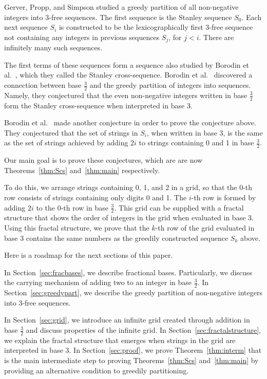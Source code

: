 \documentclass[12pt,reqno]{article}
\theoremstyle{plain}
\theoremstyle{definition}
\theoremstyle{remark}
\begin{document}
Gerver, Propp, and Simpson \cite{GPS} studied a greedy partition of all non-negative integers into 3-free sequences. The first sequence is the Stanley sequence $S_0$. Each next  sequence $S_i$ is constructed to be the lexicographically first 3-free sequence not containing any integers in previous sequences $S_j$, for $ j < i$. There are infinitely many such sequences. 

The first terms of these sequences form a sequence also studied by Borodin et al.~\cite{PSS}, which they called the Stanley cross-sequence. Borodin et al.~\cite{PSS} discovered a connection between base $\frac{3}{2}$ and the greedy partition of integers into sequences. Namely, they conjectured that the even non-negative integers written in base $\frac{3}{2}$ form the Stanley cross-sequence when interpreted in base 3.

Borodin et al.~\cite{PSS} made another conjecture in order to prove the conjecture above. They conjectured that the set of strings in $S_i$, when written in base 3, is the same as the set of strings achieved by adding $2i$ to strings containing 0 and 1 in base $\frac{3}{2}$.

Our main goal is to prove these conjectures, which are are now Theorems~\ref{thm:Scs} and~\ref{thm:main} respectively.

To do this, we arrange strings containing 0, 1, and 2 in a grid, so that the $0$-th row consists of strings containing only digits 0 and 1. The $i$-th row is formed by adding $2i$ to the $0$-th row in base $\frac{3}{2}$. This grid can be supplied with a fractal structure that shows the order of integers in the grid when evaluated in base 3. Using this fractal structure, we prove that the $k$-th row of the grid evaluated in base 3 contains the same numbers as the greedily constructed sequence $S_k$ above. 

Here is a roadmap for the next sections of this paper.

In Section~\ref{sec:fracbases}, we describe fractional bases. Particularly, we discuss the carrying mechanism of adding two to an integer in base $\frac{3}{2}$. In Section~\ref{sec:greedypart}, we describe the greedy partition of non-negative integers into 3-free sequences.
 
In Section~\ref{sec:grid}, we introduce an infinite grid created through addition in base $\frac{3}{2}$ and discuss properties of the infinite grid. 
In Section~\ref{sec:fractalstructure}, we explain the fractal structure that emerges when strings in the grid are interpreted in base 3.
In Section~\ref{sec:proof}, we prove Theorem~\ref{thm:interm} that is the main intermediate step to proving Theorems~\ref{thm:Scs} and~\ref{thm:main} by providing an alternative condition to greedily partitioning.
\end{document}
